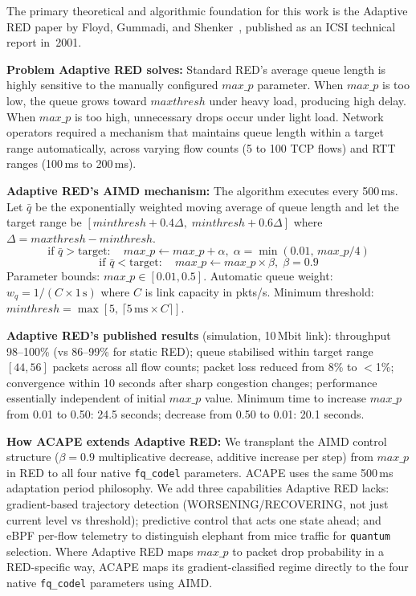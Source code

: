 \documentclass[conference]{IEEEtran}
\begin{document}
The primary theoretical and algorithmic foundation for this work is the
Adaptive RED paper by Floyd, Gummadi, and Shenker~\cite{ared2001}, published
as an ICSI technical report in~2001.

\textbf{Problem Adaptive RED solves:} Standard RED's average queue length is
highly sensitive to the manually configured $\mathit{max\_p}$ parameter.
When $\mathit{max\_p}$ is too low, the queue grows toward $\mathit{maxthresh}$
under heavy load, producing high delay. When $\mathit{max\_p}$ is too high,
unnecessary drops occur under light load. Network operators required a
mechanism that maintains queue length within a target range automatically,
across varying flow counts (5 to 100 TCP flows) and RTT ranges
(100\,ms to 200\,ms).

\textbf{Adaptive RED's AIMD mechanism:} The algorithm executes every 500\,ms.
Let $\bar{q}$ be the exponentially weighted moving average of queue length and
let the target range be $[\mathit{minthresh} + 0.4\Delta,\;
\mathit{minthresh} + 0.6\Delta]$ where $\Delta = \mathit{maxthresh} -
\mathit{minthresh}$.
\[
\text{if } \bar{q} > \text{target}:\quad
  \mathit{max\_p} \leftarrow \mathit{max\_p} + \alpha,\;
  \alpha = \min(0.01,\,\mathit{max\_p}/4)
\]
\[
\text{if } \bar{q} < \text{target}:\quad
  \mathit{max\_p} \leftarrow \mathit{max\_p} \times \beta,\;
  \beta = 0.9
\]
Parameter bounds: $\mathit{max\_p} \in [0.01, 0.5]$. Automatic queue weight:
$w_q = 1/(C \times 1\,\text{s})$ where $C$ is link capacity in pkts/s. Minimum
threshold: $\mathit{minthresh} = \max[5,\, \lceil 5\,\text{ms} \times C \rceil]$.

\textbf{Adaptive RED's published results} (simulation, 10\,Mbit link):
throughput 98--100\% (vs 86--99\% for static RED); queue stabilised within
target range $[44, 56]$ packets across all flow counts; packet loss reduced from
8\% to $<$1\%; convergence within 10 seconds after sharp congestion changes;
performance essentially independent of initial $\mathit{max\_p}$ value.
Minimum time to increase $\mathit{max\_p}$ from 0.01 to 0.50: 24.5 seconds;
decrease from 0.50 to 0.01: 20.1 seconds.

\textbf{How ACAPE extends Adaptive RED:} We transplant the AIMD control
structure ($\beta=0.9$ multiplicative decrease, additive increase per step)
from $\mathit{max\_p}$ in RED to all four native \texttt{fq\_codel} parameters.
ACAPE uses the same 500\,ms adaptation period philosophy. We add three
capabilities Adaptive RED lacks: gradient-based trajectory detection
(WORSENING/RECOVERING, not just current level vs threshold); predictive control
that acts one state ahead; and eBPF per-flow telemetry to distinguish elephant
from mice traffic for \texttt{quantum} selection. Where Adaptive RED maps
$\mathit{max\_p}$ to packet drop probability in a RED-specific way, ACAPE maps
its gradient-classified regime directly to the four native \texttt{fq\_codel}
parameters using AIMD.
\end{document}
